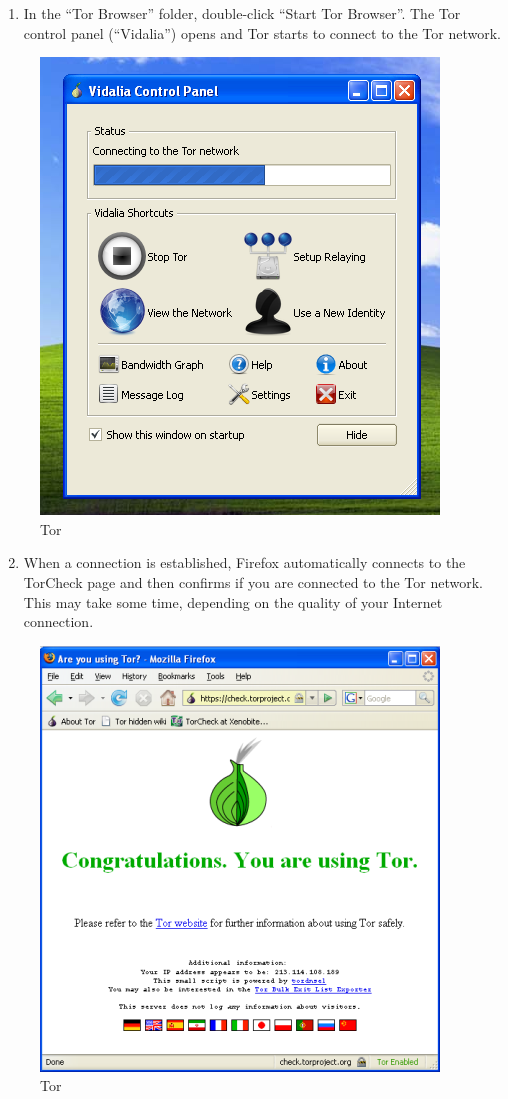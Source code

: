 \begin{enumerate}[1.]
\item
  In the ``Tor Browser'' folder, double-click ``Start Tor Browser''. The
  Tor control panel (``Vidalia'') opens and Tor starts to connect to the
  Tor network.
\end{enumerate}
\begin{figure}[htbp]
\centering
\includegraphics{tor_7.png}
\caption{Tor}
\end{figure}

\begin{enumerate}[1.]
\setcounter{enumi}{1}
\item
  When a connection is established, Firefox automatically connects to
  the TorCheck page and then confirms if you are connected to the Tor
  network. This may take some time, depending on the quality of your
  Internet connection.
\end{enumerate}
\begin{figure}[htbp]
\centering
\includegraphics{tor_8.png}
\caption{Tor}
\end{figure}

